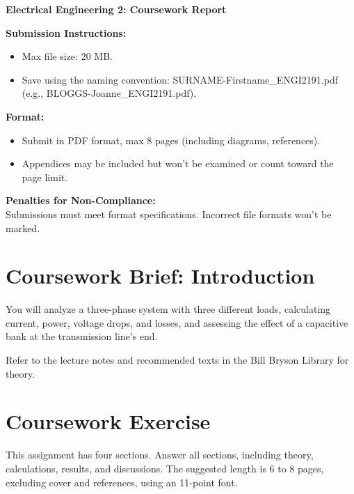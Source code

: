\documentclass[conference]{IEEEtran}
\begin{document}
\begin{center}
    \LARGE \textbf{Electrical Engineering 2: Coursework Report} \\
  
\end{center}
 
  

\vspace{0.5cm}
\noindent\textbf{Submission Instructions:} \\
\begin{itemize} 
    \item Max file size: 20 MB.
    \item Save using the naming convention: SURNAME-Firstname\_ENGI2191.pdf (e.g., BLOGGS-Joanne\_ENGI2191.pdf).
\end{itemize}

\vspace{0.5cm}
\noindent\textbf{Format:} \\
\begin{itemize}
    \item Submit in PDF format, max 8 pages (including diagrams, references).
    \item Appendices may be included but won’t be examined or count toward the page limit.
\end{itemize}

\vspace{0.5cm}
\noindent\textbf{Penalties for Non-Compliance:} \\
Submissions must meet format specifications. Incorrect file formats won’t be marked.
 
  

\vspace{1cm}
\section*{Coursework Brief: Introduction}
  You will analyze a three-phase system with three different loads, calculating current, power, voltage drops, and losses, and assessing the effect of a capacitive bank at the transmission line’s end.

\vspace{0.5cm}
Refer to the lecture notes and recommended texts in the Bill Bryson Library for theory.

\vspace{1cm}
\section*{Coursework Exercise}
This assignment has four sections. Answer all sections, including theory, calculations, results, and discussions. The suggested length is 6 to 8 pages, excluding cover and references, using an 11-point font.
\end{document}
